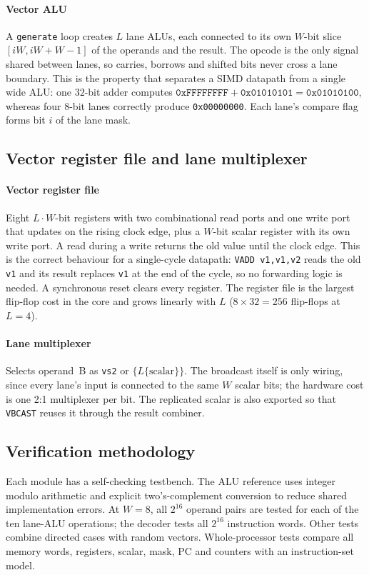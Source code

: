 \documentclass[conference]{IEEEtran}
\begin{document}
\paragraph{Vector ALU} A \texttt{generate} loop creates $L$ lane ALUs, each
connected to its own $W$-bit slice $[iW, iW+W-1]$ of the operands and the
result. The opcode is the only signal shared between lanes, so carries,
borrows and shifted bits never cross a lane boundary. This is the property that
separates a SIMD datapath from a single wide ALU: one $32$-bit adder computes
$\texttt{0xFFFFFFFF} + \texttt{0x01010101} = \texttt{0x01010100}$, whereas four
8-bit lanes correctly produce \texttt{0x00000000}. Each lane's compare flag forms
bit $i$ of the lane mask.
\subsection{Vector register file and lane multiplexer}
\paragraph{Vector register file} Eight $L\cdot W$-bit registers with two
combinational read ports and one write port that updates on the rising clock
edge, plus a $W$-bit scalar register with its own write port. A read during a
write returns the old value until the clock edge. This is the correct behaviour
for a single-cycle datapath: \texttt{VADD v1,v1,v2} reads the old \texttt{v1}
and its result replaces \texttt{v1} at the end of the cycle, so no forwarding
logic is needed. A synchronous reset clears every register. The register file
is the largest flip-flop cost in the core and grows linearly with $L$
($8 \times 32 = 256$ flip-flops at $L=4$).

\paragraph{Lane multiplexer} Selects operand~B as \texttt{vs2} or
$\{L\{\text{scalar}\}\}$. The broadcast itself is only wiring, since every lane's
input is connected to the same $W$ scalar bits; the hardware cost is one 2:1
multiplexer per bit. The replicated scalar is also exported so that
\texttt{VBCAST} reuses it through the result combiner.
\subsection{Verification methodology}
Each module has a self-checking testbench. The ALU reference uses integer
modulo arithmetic and explicit two's-complement conversion to reduce shared
implementation errors. At $W=8$, all $2^{16}$ operand pairs are tested for each
of the ten lane-ALU operations; the decoder tests all $2^{16}$ instruction
words. Other tests combine directed cases with random vectors. Whole-processor
tests compare all memory words, registers, scalar, mask, PC and counters with
an instruction-set model.
\end{document}
